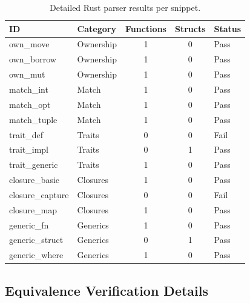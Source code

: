 \documentclass[11pt,a4paper]{article}
\begin{document}
\begin{appendices}
\begin{table}[h]
\centering
\caption{Detailed Rust parser results per snippet.}
\label{tab:rparse-detail}
\begin{tabular}{llccl}
\toprule
ID & Category & Functions & Structs & Status \\
\midrule
own\_move      & Ownership & 1 & 0 & Pass \\
own\_borrow    & Ownership & 1 & 0 & Pass \\
own\_mut       & Ownership & 1 & 0 & Pass \\
match\_int     & Match     & 1 & 0 & Pass \\
match\_opt     & Match     & 1 & 0 & Pass \\
match\_tuple   & Match     & 1 & 0 & Pass \\
trait\_def     & Traits    & 0 & 0 & Fail \\
trait\_impl    & Traits    & 0 & 1 & Pass \\
trait\_generic & Traits    & 1 & 0 & Pass \\
closure\_basic & Closures  & 1 & 0 & Pass \\
closure\_capture & Closures & 0 & 0 & Fail \\
closure\_map   & Closures  & 1 & 0 & Pass \\
generic\_fn    & Generics  & 1 & 0 & Pass \\
generic\_struct & Generics & 0 & 1 & Pass \\
generic\_where & Generics  & 1 & 0 & Pass \\
\bottomrule
\end{tabular}
\end{table}

\subsection{Equivalence Verification Details}


\end{appendices}
\end{document}
